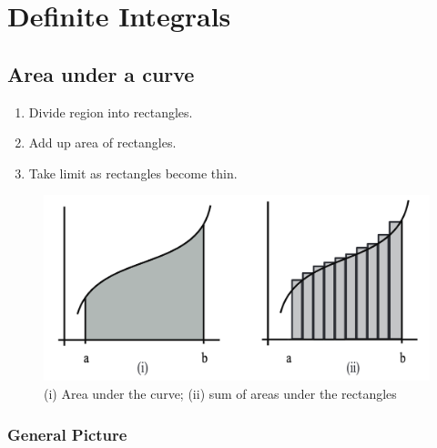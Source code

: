

\chapter{Definite Integrals}
\bigbreak

\section{Area under a curve}

\begin{enumerate}
    \item Divide region into rectangles.
    \item Add up area of rectangles.
    \item Take limit as rectangles become thin.
\end{enumerate}


\begin{figure}[ht!]
	\centering
	\includegraphics[scale=0.5]{./images/lecture_12_figure_1.png}
	\caption{(i) Area under the curve; (ii) sum of areas under the rectangles}
\end{figure}


\subsection{General Picture}

